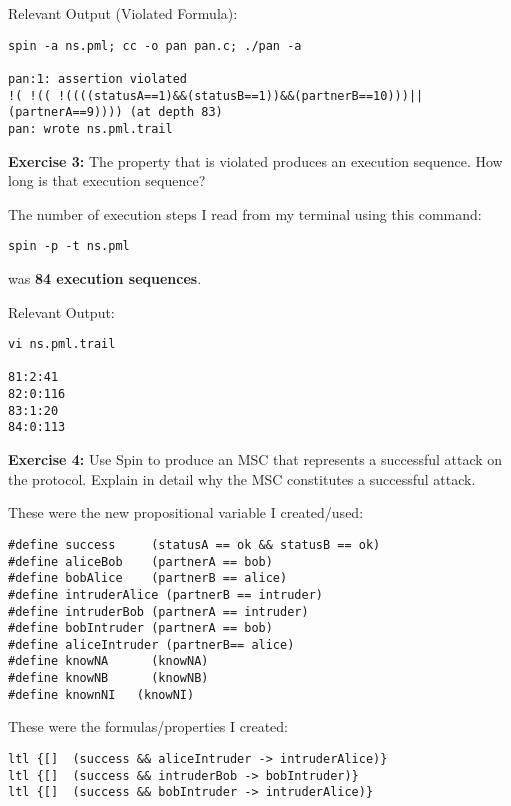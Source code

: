 \documentclass{article}
\theoremstyle{theorem}
\theoremstyle{definition}
\theoremstyle{remark}
\begin{document}
\noindent\newline Relevant Output (Violated Formula):
\begin{verbatim}
spin -a ns.pml; cc -o pan pan.c; ./pan -a

pan:1: assertion violated  
!( !(( !((((statusA==1)&&(statusB==1))&&(partnerB==10)))||(partnerA==9)))) (at depth 83)
pan: wrote ns.pml.trail

\end{verbatim}


\noindent\newline\textbf{Exercise 3:}
The property that is violated produces an execution sequence. How long is that execution sequence?

\noindent\newline The number of execution steps I read from my terminal using this command:
\begin{verbatim}
spin -p -t ns.pml
\end{verbatim}

\noindent was \textbf{84 execution sequences}. 

\noindent\newline Relevant Output:
\begin{verbatim}
vi ns.pml.trail

81:2:41
82:0:116
83:1:20
84:0:113
\end{verbatim}



\noindent\newline\textbf{Exercise 4:}
Use Spin to produce an MSC that represents a successful attack on the protocol. Explain in detail why the MSC constitutes a successful attack.


\noindent\newline These were the new propositional variable I created/used:
\begin{verbatim}
#define success		(statusA == ok && statusB == ok)
#define aliceBob	(partnerA == bob)
#define bobAlice	(partnerB == alice)
#define intruderAlice (partnerB == intruder)
#define intruderBob (partnerA == intruder)
#define bobIntruder (partnerA == bob)
#define aliceIntruder (partnerB== alice)
#define knowNA		(knowNA)
#define knowNB		(knowNB)
#define knownNI   (knowNI)
\end{verbatim}

\noindent\newline These were the formulas/properties I created:
\begin{verbatim}
ltl {[]  (success && aliceIntruder -> intruderAlice)}
ltl {[]  (success && intruderBob -> bobIntruder)}
ltl {[]  (success && bobIntruder -> intruderAlice)}
\end{verbatim}
\end{document}
